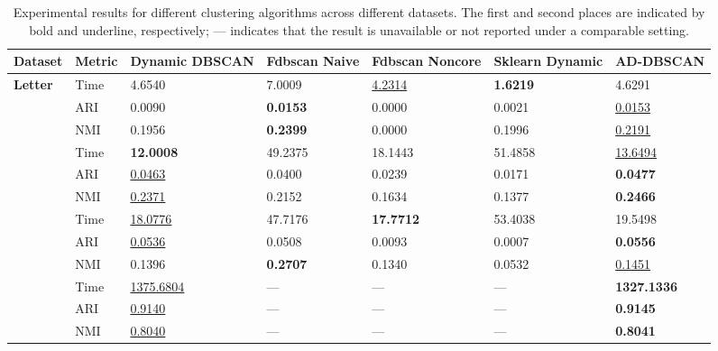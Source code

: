 \documentclass[preprint,12pt,authoryear]{elsarticle}
\theoremstyle{definition}
\begin{document}
\begin{table}[H]
\caption{Experimental results for different clustering algorithms across different datasets. The first and second places are indicated by bold and underline, respectively; --- indicates that the result is unavailable or not reported under a comparable setting.}
\label{tab:experimental_results}
\centering
\small
\begin{tabularx}{\textwidth}{llXXXXX} 
\toprule 
\textbf{Dataset} & \textbf{Metric} & \textbf{Dynamic DBSCAN} & \textbf{Fdbscan Naive} & \textbf{Fdbscan Noncore} & \textbf{Sklearn Dynamic} & \textbf{AD-DBSCAN} \\ 
\midrule 
\multirow{3}{*}{\textbf{Letter}} & Time & 4.6540 & 7.0009 & \underline{4.2314} & \textbf{1.6219} & 4.6291 \\ 
& ARI & 0.0090 & \textbf{0.0153} & 0.0000 & 0.0021 & \underline{0.0153} \\ 
& NMI & 0.1956 & \textbf{0.2399} & 0.0000 & 0.1996 & \underline{0.2191} \\ 
\addlinespace 
\multirow{3}{*}{\textbf{MNIST}} & Time & \textbf{12.0008} & 49.2375 & 18.1443 & 51.4858 & \underline{13.6494} \\ 
& ARI & \underline{0.0463} & 0.0400 & 0.0239 & 0.0171 & \textbf{0.0477} \\ 
& NMI & \underline{0.2371} & 0.2152 & 0.1634 & 0.1377 & \textbf{0.2466} \\ 
\addlinespace 
\multirow{3}{*}{\textbf{Fashion}} & Time & \underline{18.0776} & 47.7176 & \textbf{17.7712} & 53.4038 & 19.5498 \\ 
& ARI & \underline{0.0536} & 0.0508 & 0.0093 & 0.0007 & \textbf{0.0556} \\ 
& NMI & 0.1396 & \textbf{0.2707} & 0.1340 & 0.0532 & \underline{0.1451} \\ 
\addlinespace 
\multirow{3}{*}{\textbf{KDDCup99}} & Time & \underline{1375.6804} & --- & --- & --- & \textbf{1327.1336} \\ 
& ARI & \underline{0.9140} & --- & --- & --- & \textbf{0.9145} \\ 
& NMI & \underline{0.8040} & --- & --- & --- & \textbf{0.8041} \\ 

\end{tabularx}
\end{table}
\end{document}
